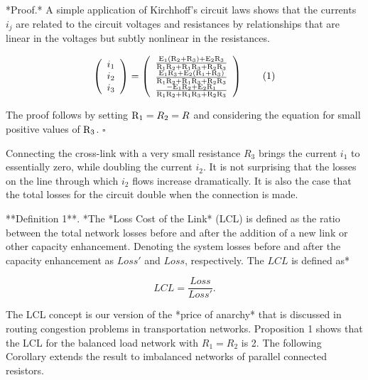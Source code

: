 *Proof.* A simple application of Kirchhoff's circuit laws shows that the currents $i_j$ are related to the circuit voltages and resistances by relationships that are linear in the voltages but subtly nonlinear in the resistances.

$$\left( \begin{array}{c}
    i_1\\ i_2\\ i_3 \\ \end{array} \right) = 
\left(\begin{array}{c}
    \frac{{\textrm E_1}({\textrm R_2 + \textrm R_3) + \textrm E_2\textrm R_3}}{{\textrm R_1\textrm R_2+\textrm R_1\textrm R_3+\textrm R_2\textrm R_3}}\\
    \frac{{\textrm E_1\textrm R_3 + \textrm E_2(\textrm R_1+\textrm R_3)}}{{\textrm R_1\textrm R_2+\textrm R_1\textrm R_3+\textrm R_2\textrm R_3}}\\
    \frac{{-\textrm E_1\textrm R_2 + \textrm E_2\textrm R_1}}{{\textrm R_1\textrm R_2+\textrm R_1\textrm R_3+\textrm R_2\textrm R_3}} \\
 \end{array} \right) \qquad (1)$$

The proof follows by setting ${\text R_1=R_2=R}$ and considering the equation for small positive values of ${\text R_3}$. $\square$

Connecting the cross-link with a very small resistance $R_3$ brings the current $i_1$ to essentially zero, while doubling the current $i_2$. It is not surprising that the losses on the line through which $i_2$ flows increase dramatically. It is also the case that the total losses for the circuit double when the connection is made.

**Definition 1**. *The *Loss Cost of the Link* (LCL) is defined as the ratio between the total network losses before and after the addition of a new link or other capacity enhancement. Denoting the system losses before and after the capacity enhancement as $Loss'$ and $Loss$, respectively. The $LCL$ is defined as*

$$LCL= \frac{Loss}{Loss'}.$$

The LCL concept is our version of the *price of anarchy* that is discussed in routing congestion problems in transportation networks. Proposition 1 shows that the LCL for the balanced load network with $R_1=R_2$ is 2. The following Corollary extends the result to imbalanced networks of parallel connected resistors.

